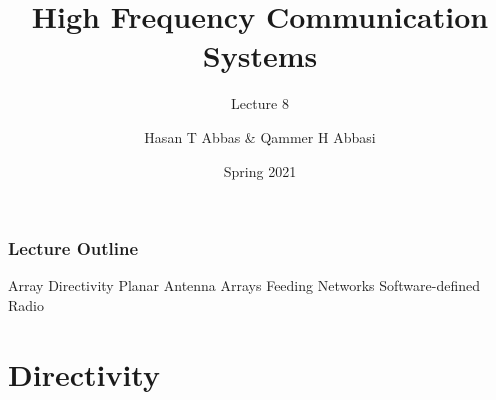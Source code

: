 \documentclass[10pt]{beamer}
\title{High Frequency Communication Systems}
\subtitle{Lecture 8}
\date{Spring 2021}
\author{Hasan T Abbas \& Qammer H Abbasi}
\begin{document}
\maketitle

\begin{frame}[fragile]
    \frametitle{Lecture Outline}
    \begin{outline}[itemize]
        \1 Array Directivity
        \1 Planar Antenna Arrays
        \1 Feeding Networks
        \1 Software-defined Radio 
    \end{outline}
\end{frame}

\section{Directivity}
\end{document}
